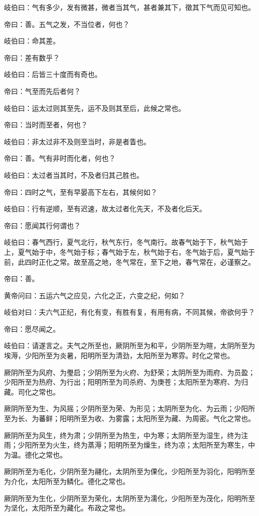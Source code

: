 \documentclass{article}%
\begin{document}
岐伯曰：气有多少，发有微甚，微者当其气，甚者兼其下，徵其下气而见可知也。

帝曰：善。五气之发，不当位者，何也？

岐伯曰：命其差。

帝曰：差有数乎？

岐伯曰：后皆三十度而有奇也。

帝曰：气至而先后者何？

岐伯曰：运太过则其至先，运不及则其至后，此候之常也。

帝曰：当时而至者，何也？

岐伯曰：非太过非不及则至当时，非是者眚也。

帝曰：善。气有非时而化者，何也？

岐伯曰：太过者当其时，不及者归其己胜也。

帝曰：四时之气，至有早晏高下左右，其候何如？

岐伯曰：行有逆顺，至有迟速，故太过者化先天，不及者化后天。

帝曰：愿闻其行何谓也？

岐伯曰：春气西行，夏气北行，秋气东行，冬气南行。故春气始于下，秋气始于上，夏气始于中，冬气始于标；春气始于左，秋气始于右，冬气始于后，夏气始于前，此四时正化之常。故至高之地，冬气常在，至下之地，春气常在，必谨察之。

帝曰：善。

黄帝问曰：五运六气之应见，六化之正，六变之纪，何如？

岐伯对曰：夫六气正纪，有化有变，有胜有复，有用有病，不同其候，帝欲何乎？

帝曰：愿尽闻之。

岐伯曰：请遂言之。夫气之所至也，厥阴所至为和平，少阴所至为暄，太阴所至为埃溽，少阳所至为炎暑，阳明所至为清劲，太阳所至为寒雰。时化之常也。

厥阴所至为风府、为璺启；少阴所至为火府、为舒荣；太阴所至为雨府、为员盈；少阳所至为热府、为行出；阳明所至为司杀府、为庚苍；太阳所至为寒府、为归藏。司化之常也。

厥阴所至为生、为风摇；少阴所至为荣、为形见；太阴所至为化、为云雨；少阳所至为长、为蕃鲜；阳明所至为收、为雾露；太阳所至为藏、为周密。气化之常也。

厥阴所至为风生，终为肃；少阴所至为热生，中为寒；太阴所至为湿生，终为注雨；少阳所至为火生，终为蒸溽；阳明所至为燥生，终为凉；太阳所至为寒生，中为温。德化之常也。

厥阴所至为毛化，少阴所至为翮化，太阴所至为倮化，少阳所至为羽化，阳明所至为介化，太阳所至为鳞化。德化之常也。

厥阴所至为生化，少阴所至为荣化，太阴所至为濡化，少阳所至为茂化，阳明所至为坚化，太阳所至为藏化。布政之常也。
\end{document}
